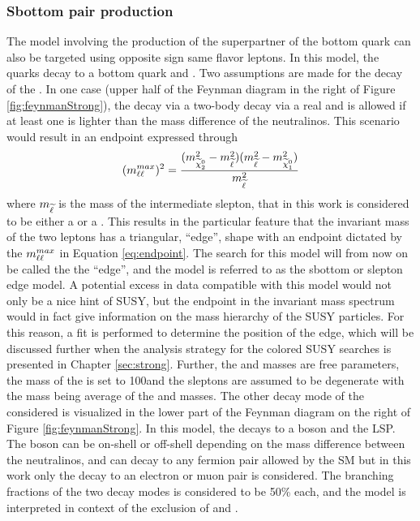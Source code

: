 \subsubsection*{Sbottom pair production}
\noindent\justify
The model involving the production of the superpartner of the bottom quark can also be targeted using opposite sign same flavor leptons.
In this model, the \sbottom quarks decay to a bottom quark and \PSGczDt. 
Two assumptions are made for the decay of the \PSGczDt. 
In one case (upper half of the Feynman diagram in the right of Figure \ref{fig:feynmanStrong}), the \PSGczDt decay via a two-body decay via a real \slep and is allowed if at least one \slep is lighter than the mass difference of the neutralinos. 
This scenario would result in an endpoint expressed through
\begin{equation}
(m_{\ell\ell}^{max})^{2}=\frac{(m_{\widetilde{\chi}^{0}_{2}}^{2}-m_{\widetilde{\ell}}^{2})(m_{\widetilde{\ell}}^{2}-m_{\widetilde{\chi}^{0}_{1}}^{2})}{m_{\widetilde{\ell}}^{2}}
\label{eq:endpoint}
\end{equation}
where $m_{\widetilde{\ell}}$ is the mass of the intermediate slepton, that in this work is considered to be either a \se or a \sm. 
This results in the particular feature that the invariant mass of the two leptons has a triangular, ``edge'', shape with an endpoint dictated by the $m_{\ell\ell}^{max}$ in Equation \ref{eq:endpoint}. 
The search for this model will from now on be called the the ``edge'', and the model is referred to as the sbottom or slepton edge model. 
A potential excess in data compatible with this model would not only be a nice hint of SUSY, but the endpoint in the invariant mass spectrum would in fact give information on the mass hierarchy of the SUSY particles. 
For this reason, a fit is performed to determine the position of the edge, which will be discussed further when the analysis strategy for the colored SUSY searches is presented in Chapter \ref{sec:strong}. 
Further, the \sbottom and \PSGczDt masses are free parameters, the mass of the \PSGczDo is set to 100\GeV and the sleptons are assumed to be degenerate with the mass being average of the \PSGczDt and \PSGczDo masses. 
\newpara
\noindent\justify
The other decay mode of the \PSGczDt considered is visualized in the lower part of the Feynman diagram on the right of Figure \ref{fig:feynmanStrong}.
In this model, the \PSGczDt decays to a \PZ boson and the \PSGczDo LSP. 
The \PZ boson can be on-shell or off-shell depending on the mass difference between the neutralinos, and can decay to any fermion pair allowed by the SM but in this work only the decay to an electron or muon pair is considered. 
The branching fractions of the two \PSGczDt decay modes is considered to be 50\% each, and the model is interpreted in context of the exclusion of \sbottom and \PSGczDt. 
